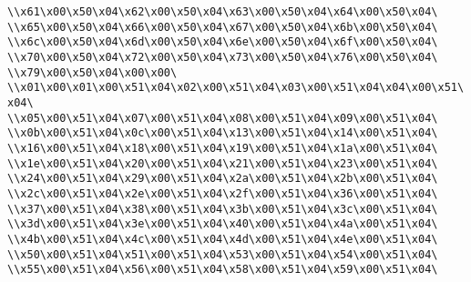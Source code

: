 \verb|\\x61\x00\x50\x04\x62\x00\x50\x04\x63\x00\x50\x04\x64\x00\x50\x04\|\newline
\verb|\\x65\x00\x50\x04\x66\x00\x50\x04\x67\x00\x50\x04\x6b\x00\x50\x04\|\newline
\verb|\\x6c\x00\x50\x04\x6d\x00\x50\x04\x6e\x00\x50\x04\x6f\x00\x50\x04\|\newline
\verb|\\x70\x00\x50\x04\x72\x00\x50\x04\x73\x00\x50\x04\x76\x00\x50\x04\|\newline
\verb|\\x79\x00\x50\x04\x00\x00\|\newline
\verb|\\x01\x00\x01\x00\x51\x04\x02\x00\x51\x04\x03\x00\x51\x04\x04\x00\x51\x04\|\newline
\verb|\\x05\x00\x51\x04\x07\x00\x51\x04\x08\x00\x51\x04\x09\x00\x51\x04\|\newline
\verb|\\x0b\x00\x51\x04\x0c\x00\x51\x04\x13\x00\x51\x04\x14\x00\x51\x04\|\newline
\verb|\\x16\x00\x51\x04\x18\x00\x51\x04\x19\x00\x51\x04\x1a\x00\x51\x04\|\newline
\verb|\\x1e\x00\x51\x04\x20\x00\x51\x04\x21\x00\x51\x04\x23\x00\x51\x04\|\newline
\verb|\\x24\x00\x51\x04\x29\x00\x51\x04\x2a\x00\x51\x04\x2b\x00\x51\x04\|\newline
\verb|\\x2c\x00\x51\x04\x2e\x00\x51\x04\x2f\x00\x51\x04\x36\x00\x51\x04\|\newline
\verb|\\x37\x00\x51\x04\x38\x00\x51\x04\x3b\x00\x51\x04\x3c\x00\x51\x04\|\newline
\verb|\\x3d\x00\x51\x04\x3e\x00\x51\x04\x40\x00\x51\x04\x4a\x00\x51\x04\|\newline
\verb|\\x4b\x00\x51\x04\x4c\x00\x51\x04\x4d\x00\x51\x04\x4e\x00\x51\x04\|\newline
\verb|\\x50\x00\x51\x04\x51\x00\x51\x04\x53\x00\x51\x04\x54\x00\x51\x04\|\newline
\verb|\\x55\x00\x51\x04\x56\x00\x51\x04\x58\x00\x51\x04\x59\x00\x51\x04\|\newline
